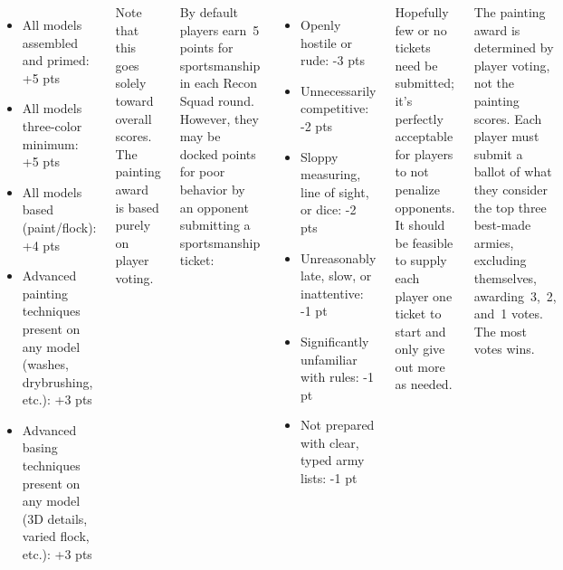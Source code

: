 \begin{columns}
\begin{itemize}\shortlist
\item All models assembled and primed: \hfill +5 pts
\item All models three-color minimum: \hfill +5 pts
\item All models based (paint/flock): \hfill +4 pts
\item Advanced painting techniques present on any model (washes,
  drybrushing, etc.): \hfill +3 pts
\item Advanced basing techniques present on any model (3D details,
  varied flock, etc.): \hfill +3 pts
\end{itemize}

Note that this goes solely toward overall scores.  The painting award
is based purely on player voting.





By default players earn~5 points for sportsmanship in each Recon Squad
round.  However, they may be docked points for poor behavior by an
opponent submitting a sportsmanship ticket:

\begin{itemize}\shortlist\setlength{\parskip}{0pt}\setlength{\itemsep}{2pt}
\item Openly hostile or rude: \hfill -3 pts
\item Unnecessarily competitive: \hfill -2 pts
\item Sloppy measuring, line of sight, or dice: \hfill -2 pts
\item Unreasonably late, slow, or inattentive: \hfill -1 pt
\item Significantly unfamiliar with rules:
  \hfill -1 pt
\item Not prepared with clear, typed army lists: \hfill -1 pt
\end{itemize}

Hopefully few or no tickets need be submitted; it's perfectly
acceptable for players to not penalize opponents.  It should be
feasible to supply each player one ticket to start and only give out
more as needed.

  The painting award is determined
by player voting, not the painting scores.  Each player must submit a
ballot of what they consider the top three best-made armies, excluding
themselves, awarding~3,~2, and~1 votes.  The most votes wins.

\end{columns}

